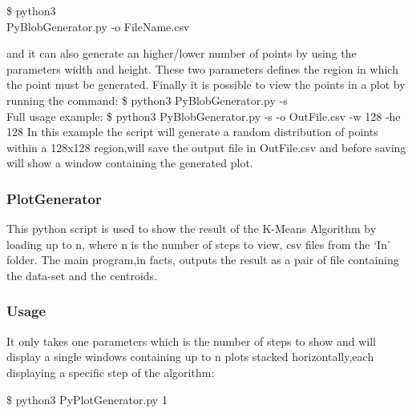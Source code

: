 \documentclass[10pt,twocolumn,letterpaper]{article}
\newenvironment{Shaded}{}{}
\newcommand{\ExtensionTok}[1]{#1}
\newcommand{\NormalTok}[1]{#1}
\begin{document}
\begin{Shaded}
\begin{Highlighting}[]
\NormalTok{\$ }\ExtensionTok{python3}\\
\NormalTok{ PyBlobGenerator.py -o FileName.csv}
\end{Highlighting}
\end{Shaded}
and it can also generate an higher/lower number of points by using the parameters width and height.\newline
These two parameters defines the region in which the point must be generated.\newline
Finally it is possible to view the points in a plot by running the command:\newline
\NormalTok{\$ }\ExtensionTok{python3}\NormalTok{ PyBlobGenerator.py -s }\\
Full usage example:\newline
\NormalTok{\$ }\ExtensionTok{python3}\NormalTok{ PyBlobGenerator.py -s -o OutFile.csv -w 128 -he 128 }\newline
In this example the script will generate a random distribution of points within a 128x128 region,will save the output file in 
OutFile.csv and before saving will show a window containing the generated plot.\newline
\subsubsection{PlotGenerator}
This python script is used to show the result of the K-Means Algorithm by loading up to n, where n is the number of steps to view, csv 
files from the `In' folder.\newline
The main program,in facts, outputs the result as a pair of file containing the data-set and the centroids.\newline
\subsubsection{Usage}
It only takes one parameters which is the number of steps to show and will display a single windows containing up to n plots stacked
horizontally,each displaying a specific step of the algorithm:\newline
\begin{Shaded}
\begin{Highlighting}[]
\NormalTok{\$ }\ExtensionTok{python3} \NormalTok{ PyPlotGenerator.py 1}
\end{Highlighting}
\end{Shaded}
\end{document}
